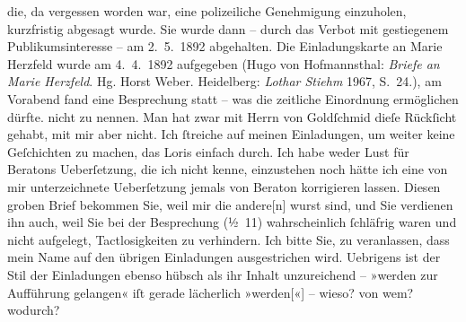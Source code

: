 \begin{ledgroupsized}[t]{13cm}
{{{                  die, da vergessen worden war, eine polizeiliche Genehmigung einzuholen,
                  kurzfristig abgesagt wurde. Sie wurde dann – durch das Verbot mit gestiegenem
                  Publikumsinteresse – am 2. 5. 1892 abgehalten. Die Einladungskarte an
                     Marie Herzfeld wurde am
                     4. 4. 1892 aufgegeben (Hugo von Hofmannsthal: \emph{Briefe an Marie Herzfeld}. Hg. Horst Weber. Heidelberg:
                        \emph{Lothar Stiehm}{ }1967, S. 24.), am Vorabend fand eine Besprechung statt –
                  was die zeitliche Einordnung ermöglichen dürfte.}}}\label{K_L00092-1h} nicht zu nennen. Man hat
               zwar mit Herrn von Goldſchmid dieſe Rückſicht
               gehabt, mit mir aber nicht. Ich ſtreiche auf meinen Einladungen, um weiter keine
               Geſchichten zu machen, das Loris einfach durch. Ich habe {\pb}weder Lust für Beratons Ueberſetzung, die ich nicht
               kenne, einzustehen noch hätte ich eine von mir unterzeichnete Ueberſetzung jemals von
                  Beraton korrigieren lassen. Diesen groben
               Brief bekommen Sie, weil mir die andere{[}n{]} wurst sind, und Sie
               verdienen ihn auch, weil Sie bei der Besprechung (½ 11) wahrscheinlich
               ſchläfrig waren und nicht aufgelegt, Tactlosigkeiten zu verhindern.\pend
           \pstart
           Ich bitte Sie, zu veranlassen, dass mein Name auf den übrigen Einladungen
               ausgestrichen wird. Uebrigens ist der Stil der Einladungen ebenso hübsch als ihr
               Inhalt unzureichend – »werden zur Aufführung gelangen« iſt gerade lächerlich
                  »werden{[}«{]} – wieso? von wem? wodurch?\pend

\end{ledgroupsized}
